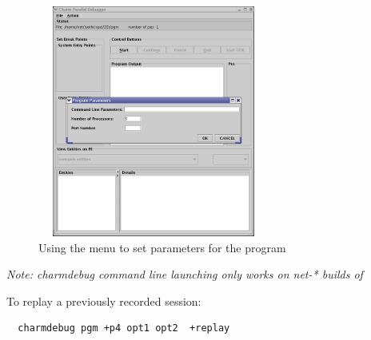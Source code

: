 \documentclass[10pt,dvips]{article}
\begin{document}
\begin{figure}[]
\includegraphics[scale=0.5, height=3in, width=3in]{figs/menu}
\caption{Using the menu to set parameters for the \charmpp{} program}
\label{menu}
\end{figure}




\emph{Note: charmdebug command line launching only works on net-*
builds of \charmpp{} }

To replay a previously recorded session:

\begin{verbatim}
  charmdebug pgm +p4 opt1 opt2  +replay
\end{verbatim}






\end{document}
